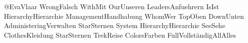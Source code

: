 @EvaVlaar WrongFalsch WithMit OurUnseren LeadersAnfuehrern IsIst HierarchyHierarchie ManagementHandhabung WhomWer TopOben DownUnten AdministeringVerwalten StarSternen System HierarchyHierarchie SeeSehe ClothesKleidung StarSternen TrekReise ColorsFarben FullVollständigAllAlles
